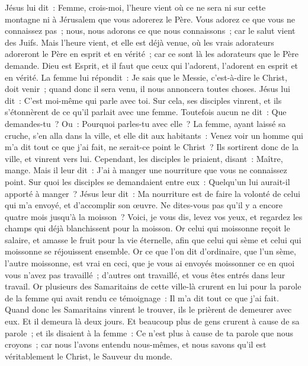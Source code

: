 \begin{multicols}{2}
Jésus lui dit~: Femme, crois-moi, l'heure vient où ce ne sera ni sur cette montagne ni à Jérusalem que vous adorerez le Père.
Vous adorez ce que vous ne connaissez pas~; nous, nous adorons ce que nous connaissons~; car le salut vient des Juifs.
Mais l'heure vient, et elle est déjà venue, où les vrais adorateurs adoreront le Père en esprit et en vérité~; car ce sont là les adorateurs que le Père demande.
Dieu est Esprit, et il faut que ceux qui l'adorent, l'adorent en esprit et en vérité.
La femme lui répondit~: Je sais que le Messie, c'est-à-dire le Christ, doit venir~; quand donc il sera venu, il nous annoncera toutes choses.
Jésus lui dit~: C'est moi-même qui parle avec toi.
Sur cela, ses disciples vinrent, et ils s'étonnèrent de ce qu'il parlait avec une femme. Toutefois aucun ne dit~: Que demandes-tu~? Ou~: Pourquoi parles-tu avec elle~?
La femme, ayant laissé sa cruche, s'en alla dans la ville, et elle dit aux habitants~:
Venez voir un homme qui m'a dit tout ce que j'ai fait, ne serait-ce point le Christ~?
Ils sortirent donc de la ville, et vinrent vers lui.
Cependant, les disciples le priaient, disant~: Maître, mange.
Mais il leur dit~: J'ai à manger une nourriture que vous ne connaissez point.
Sur quoi les disciples se demandaient entre eux~: Quelqu'un lui aurait-il apporté à manger~?
Jésus leur dit~: Ma nourriture est de faire la volonté de celui qui m'a envoyé, et d'accomplir son œuvre.
Ne dites-vous pas qu'il y a encore quatre mois jusqu'à la moisson~? Voici, je vous dis, levez vos yeux, et regardez les champs qui déjà blanchissent pour la moisson.
Or celui qui moissonne reçoit le salaire, et amasse le fruit pour la vie éternelle, afin que celui qui sème et celui qui moissonne se réjouissent ensemble.
Or ce que l'on dit d'ordinaire, que l'un sème, l'autre moissonne, est vrai en ceci,
que je vous ai envoyés moissonner ce en quoi vous n'avez pas travaillé~; d'autres ont travaillé, et vous êtes entrés dans leur travail.
Or plusieurs des Samaritains de cette ville-là crurent en lui pour la parole de la femme qui avait rendu ce témoignage~: Il m'a dit tout ce que j'ai fait.
Quand donc les Samaritains vinrent le trouver, ils le prièrent de demeurer avec eux. Et il demeura là deux jours.
Et beaucoup plus de gens crurent à cause de sa parole~;
et ils disaient à la femme~: Ce n'est plus à cause de ta parole que nous croyons~; car nous l'avons entendu nous-mêmes, et nous savons qu'il est véritablement le Christ, le Sauveur du monde.

\end{multicols}
